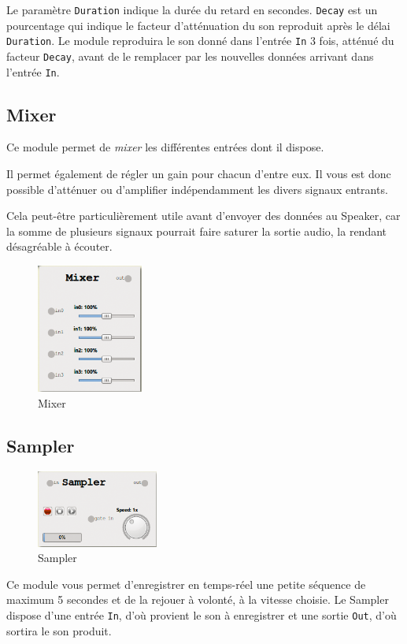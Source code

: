 \documentclass[a4paper,oneside,frenchb,10pt]{article}
\begin{document}
Le paramètre \verb!Duration! indique la durée du retard en secondes.
\verb!Decay! est un pourcentage qui indique le facteur d'atténuation du
son reproduit après le délai \verb!Duration!. Le module reproduira le
son donné dans l'entrée \verb!In! 3 fois, atténué du facteur
\verb!Decay!, avant de le remplacer par les nouvelles données arrivant
dans l'entrée \verb!In!.

\subsection{Mixer}

\begin{multicols}{2}
Ce module permet de \emph{mixer} les différentes entrées dont il dispose.

Il permet également de régler un gain pour chacun d'entre eux. Il vous est
donc possible d'atténuer ou d'amplifier indépendamment les divers signaux entrants.

Cela peut-être particulièrement utile avant d'envoyer des données au
Speaker, car la somme de plusieurs signaux pourrait faire saturer la
sortie audio, la rendant désagréable à écouter.

\begin{figure}[H]
\centering
\includegraphics[width=3.5cm]{../img/png/mixer.png}
\caption{Mixer}
\end{figure}
\end{multicols}

\subsection{Sampler}

\begin{multicols}{2}
\begin{figure}[H]
\centering
\includegraphics[width=4cm]{../img/png/sampler.png}
\caption{Sampler}
\end{figure}

Ce module vous permet d'enregistrer en temps-réel une petite séquence de
maximum 5 secondes et de la rejouer à volonté, à la vitesse choisie. Le
Sampler dispose d'une entrée \verb!In!, d'où provient le son à
enregistrer et une sortie \verb!Out!, d'où sortira le son produit.

\end{multicols}
\end{document}

